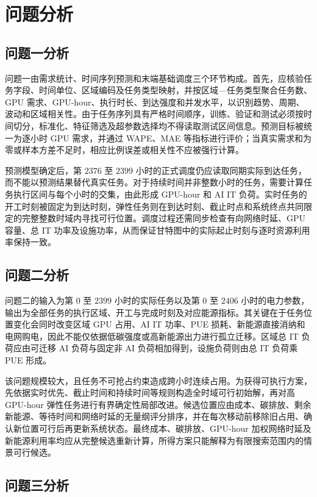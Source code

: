 \section{问题分析}

\subsection{问题一分析}

问题一由需求统计、时间序列预测和末端基础调度三个环节构成。首先，应核验任务字段、时间单位、区域编码及任务类型映射，并按区域—任务类型聚合任务数、GPU 需求、GPU-hour、执行时长、到达强度和并发水平，以识别趋势、周期、波动和区域相关性。由于任务序列具有严格时间顺序，训练、验证和测试必须按时间切分，标准化、特征筛选及超参数选择均不得读取测试区间信息。预测目标被统一为逐小时 GPU 需求，并通过 WAPE、MAE 等指标进行评价；当真实需求和为零或样本方差不足时，相应比例误差或相关性不应被强行计算。

预测模型确定后，第 $2376$ 至 $2399$ 小时的正式调度仍应读取同期实际到达任务，而不能以预测结果替代真实任务。对于持续时间并非整数小时的任务，需要计算任务执行区间与每个小时的交集，由此形成 GPU-hour 和 AI IT 负荷。实时任务的开工时刻被固定为到达时刻，弹性任务则在到达时刻、截止时点和系统终点共同限定的完整整数时域内寻找可行位置。调度过程还需同步检查有向网络时延、GPU 容量、总 IT 功率及设施功率，从而保证甘特图中的实际起止时刻与逐时资源利用率保持一致。

\subsection{问题二分析}

问题二的输入为第 $0$ 至 $2399$ 小时的实际任务以及第 $0$ 至 $2406$ 小时的电力参数，输出为全部任务的执行区域、开工与完成时刻及对应能源指标。其关键在于任务位置变化会同时改变区域 GPU 占用、AI IT 功率、PUE 损耗、新能源直接消纳和电网购电，因此不能仅依据低碳强度或高新能源出力进行孤立迁移。区域总 IT 负荷应由可迁移 AI 负荷与固定非 AI 负荷相加得到，设施负荷则由总 IT 负荷乘 PUE 形成。

该问题规模较大，且任务不可抢占约束造成跨小时连续占用。为获得可执行方案，先依据实时优先、截止时间和持续时间等规则构造全时域可行初始解，再对高 GPU-hour 弹性任务进行有界确定性局部改进。候选位置应由成本、碳排放、剩余新能源、等待时间和网络时延的无量纲评分排序，并在每次移动前移除旧占用、确认新位置可行后再更新系统状态。最终成本、碳排放、GPU-hour 加权网络时延及新能源利用率均应从完整候选重新计算，所得方案只能解释为有限搜索范围内的情景可行候选。

\subsection{问题三分析}

